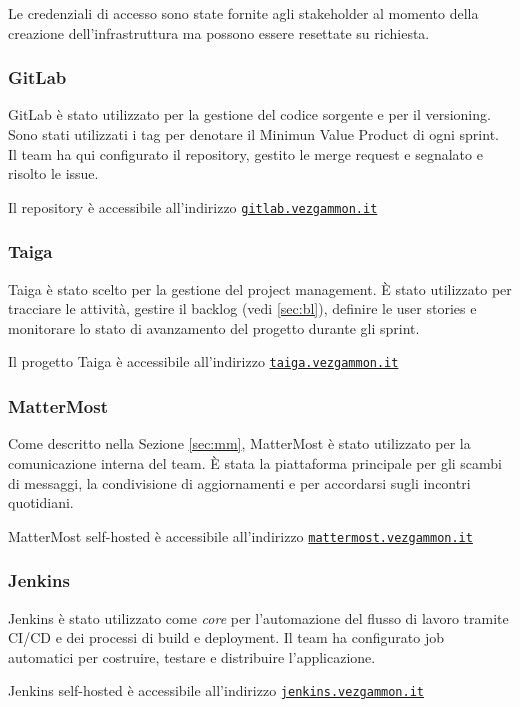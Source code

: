 \documentclass{article}
\begin{document}
Le credenziali di accesso sono state fornite agli stakeholder al momento della creazione dell'infrastruttura ma possono 
essere resettate su richiesta.

\subsubsection{GitLab}
GitLab è stato utilizzato per la gestione del codice sorgente e per il versioning. Sono stati utilizzati i tag per denotare 
il Minimun Value Product di ogni sprint. 
Il team ha qui configurato il repository, gestito le merge request e segnalato e risolto le issue.

Il repository è accessibile all'indirizzo \href{https://gitlab.vezgammon.it}{\texttt{gitlab.vezgammon.it}}  

\subsubsection{Taiga}
Taiga è stato scelto per la gestione del project management. È stato utilizzato per tracciare le attività, gestire il 
backlog (vedi \ref{sec:bl}), definire le user stories e monitorare lo stato di avanzamento del progetto durante gli sprint.

Il progetto Taiga è accessibile all'indirizzo \href{https://taiga.vezgammon.it}{\texttt{taiga.vezgammon.it}}

\subsubsection{MatterMost}
Come descritto nella Sezione \ref{sec:mm}, MatterMost è stato utilizzato per la comunicazione interna del team. È stata 
la piattaforma principale per gli scambi di messaggi, la condivisione di aggiornamenti e per accordarsi sugli incontri quotidiani.

MatterMost self-hosted è accessibile all'indirizzo \href{https://mattermost.vezgammon.it}{\texttt{mattermost.vezgammon.it}}

\subsubsection{Jenkins}
Jenkins è stato utilizzato come \textit{core} per l'automazione del flusso di lavoro tramite CI/CD e dei processi di build 
e deployment. Il team ha configurato job automatici per costruire, testare e distribuire l'applicazione.

Jenkins self-hosted è accessibile all'indirizzo \href{https://jenkins.vezgammon.it}{\texttt{jenkins.vezgammon.it}}
\end{document}

